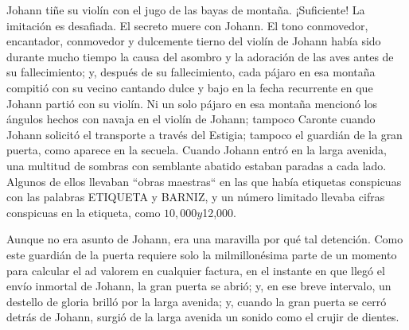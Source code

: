 \documentclass[12pt]{book}
\begin{document}
Johann tiñe su violín con el jugo de las bayas de montaña. ¡Suficiente! La imitación es desafiada. El secreto muere con Johann. El tono conmovedor, encantador, conmovedor y dulcemente tierno del violín de Johann había sido durante mucho tiempo la causa del asombro y la adoración de las aves antes de su fallecimiento; y, después de su fallecimiento, cada pájaro en esa montaña compitió con su vecino cantando dulce y bajo en la fecha recurrente en que Johann partió con su violín. Ni un solo pájaro en esa montaña mencionó los ángulos hechos con navaja en el violín de Johann; tampoco Caronte cuando Johann solicitó el transporte a través del Estigia; tampoco el guardián de la gran puerta, como aparece en la secuela. Cuando Johann entró en la larga avenida, una multitud de sombras con semblante abatido estaban paradas a cada lado. Algunos de ellos llevaban ``obras maestras`` en las que había etiquetas conspicuas con las palabras ETIQUETA y BARNIZ, y un número limitado llevaba cifras conspicuas en la etiqueta, como $10,000 y $12,000.

Aunque no era asunto de Johann, era una maravilla por qué tal detención. Como este guardián de la puerta requiere solo la milmillonésima parte de un momento para calcular el ad valorem en cualquier factura, en el instante en que llegó el envío inmortal de Johann, la gran puerta se abrió; y, en ese breve intervalo, un destello de gloria brilló por la larga avenida; y, cuando la gran puerta se cerró detrás de Johann, surgió de la larga avenida un sonido como el crujir de dientes.
\end{document}
